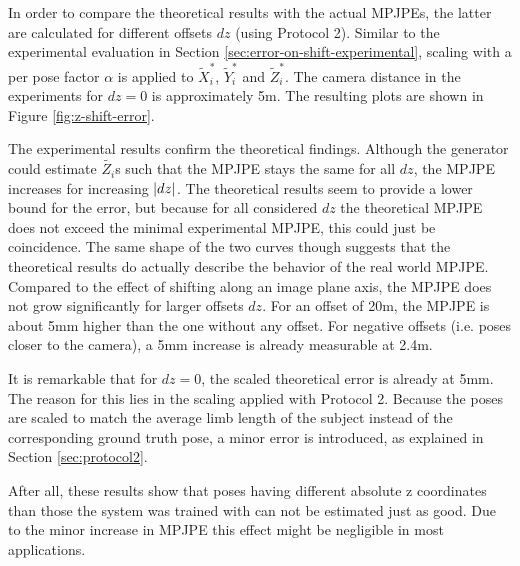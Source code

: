 

In order to compare the theoretical results with the actual MPJPEs, the latter are calculated for different offsets $dz$ (using Protocol 2).
Similar to the experimental evaluation in Section \ref{sec:error-on-shift-experimental}, scaling with a per pose factor $\alpha$ is applied to $\widetilde{X}_i^\ast$, $\widetilde{Y}_i^\ast$ and $\widetilde{Z}_i^\ast$.
The camera distance in the experiments for $dz = 0$ is approximately 5m.
The resulting plots are shown in Figure \ref{fig:z-shift-error}.

The experimental results confirm the theoretical findings.
Although the generator could estimate $\widetilde{Z_i}$s such that the MPJPE stays the same for all $dz$, the MPJPE increases for increasing $\abs{dz}$.
The theoretical results seem to provide a lower bound for the error, but because for all considered $dz$ the theoretical MPJPE does not exceed the minimal experimental MPJPE, this could just be coincidence.
The same shape of the two curves though suggests that the theoretical results do actually describe the behavior of the real world MPJPE.
Compared to the effect of shifting along an image plane axis, the MPJPE does not grow significantly for larger offsets $dz$.
For an offset of 20m, the MPJPE is about 5mm higher than the one without any offset.
For negative offsets (i.e. poses closer to the camera), a 5mm increase is already measurable at 2.4m.

It is remarkable that for $dz = 0$, the scaled theoretical error is already at 5mm.
The reason for this lies in the scaling applied with Protocol 2.
Because the poses are scaled to match the average limb length of the subject instead of the corresponding ground truth pose, a minor error is introduced, as explained in Section \ref{sec:protocol2}.

After all, these results show that poses having different absolute z coordinates than those the system was trained with can not be estimated just as good.
Due to the minor increase in MPJPE this effect might be negligible in most applications.
